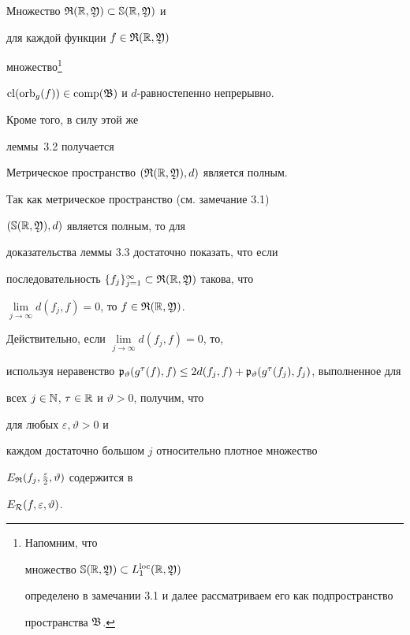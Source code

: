 \begin{cors}


Множество $\frak R(\Bbb R,\frak Y)\subset\Bbb S(\Bbb R,\frak Y)$ и


для каждой функции $f\in\frak R(\Bbb R,\frak Y)$


мно\-же\-ство\footnote{Напомним, что


множество $\Bbb S(\Bbb R,\frak Y)\subset L_1^{\operatorname{loc}}(\Bbb R,\frak Y)$


определено в замечании 3.1 и далее рассматриваем его как подпространство


пространства $\frak B$.}


$\operatorname{cl}(\operatorname{orb}_g(f))\in\operatorname{comp}(\frak B)$ и $d$-равностепенно непрерывно.


\end{cors}


\setcounter{footnote}{0}





Кроме того, в силу этой же


леммы~3.2 получается








\begin{lems}


Метрическое пространство $(\frak R(\Bbb R,\frak Y),d)$ является полным.


\end{lems}








\begin{pf}


Так как метрическое пространство (см. замечание 3.1)


$(\Bbb S(\Bbb R,\frak Y),d)$ является полным, то для


доказательства леммы 3.3 достаточно показать, что если


последовательность $\{f_j\}_{j=1}^\infty\subset


\frak R(\Bbb R,\frak Y)$ такова, что


$\lim\limits_{j\to\infty}d(f_{j},f)=0$, то $f\in\frak R(\Bbb R,\frak Y)$.


Действительно, если $\lim\limits_{j\to\infty}d(f_{j},f)=0$, то,


используя неравенство $\frak p_{\vartheta}(g^\tau(f),f)\le


2d(f_j,f)+\frak p_\vartheta(g^\tau(f_j),f_{j})$, выполненное для


всех $j\in\Bbb N$, $\tau\in\Bbb R$ и $\vartheta>0$, получим, что


для любых $\varepsilon,\vartheta>0$ и


каждом достаточно большом $j$ относительно плотное множество


$E_{\frak R}(f_j,\frac{\varepsilon}{2},\vartheta)$ содержится в


$E_{\cal R}(f,\varepsilon,\vartheta)$.


\end{pf}





